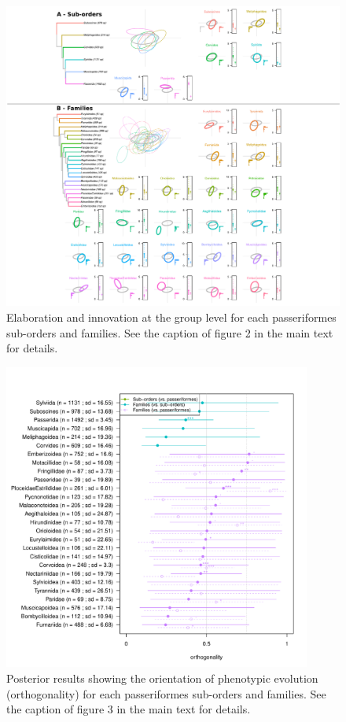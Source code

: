 \documentclass[12pt,letterpaper]{article}
\begin{document}
\begin{figure}[!htbp]
\centering
   \includegraphics[width=1\textwidth]{Figures/ellipses_passeriformes.pdf}
\caption{Elaboration and innovation at the group level for each passeriformes sub-orders and families. See the caption of figure 2 in the main text for details.}
\label{fig_ellipses_passeriformes}
\end{figure}

\begin{figure}[!htbp]
\centering
   \includegraphics[width=0.9\textwidth]{Figures/orthogonality_results_passeriformes.pdf}
\caption{Posterior results showing the orientation of phenotypic evolution (orthogonality) for each passeriformes sub-orders and families. See the caption of figure 3 in the main text for details.}
\label{fig_orthogonality_passeriformes}
\end{figure}
\end{document}
